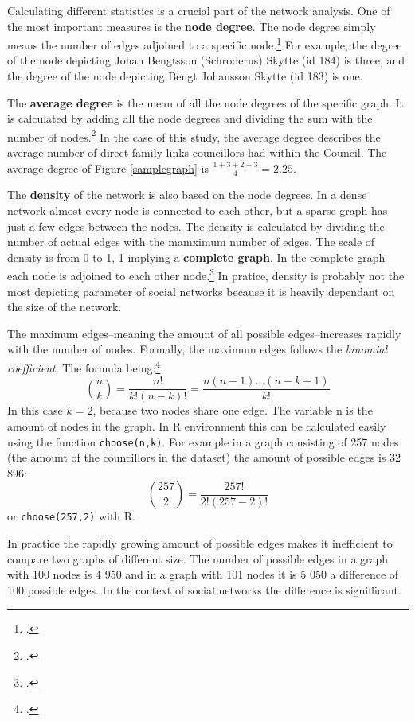 Calculating different statistics is a crucial part of the network analysis. One of the most important measures is the \textbf{node degree}. The node degree simply means the number of edges adjoined to a specific node.\footcite[pp. 2-3.]{RajPM2018} For example, the degree of the node depicting Johan Bengtsson (Schroderus) Skytte (id 184) is three, and the degree of the node depicting Bengt Johansson Skytte (id 183) is one. 

The \textbf{average degree} is the mean of all the node degrees of the specific graph. It is calculated by adding all the node degrees and dividing the sum with the number of nodes.\footcite[pp. 3-4.]{RajPM2018} In the case of this study, the average degree describes the average number of direct family links councillors had within the Council. The average degree of Figure \ref{samplegraph} is $\frac{1 + 3 + 2 + 3}{4} = 2.25$.

The \textbf{density} of the network is also based on the node degrees. In a dense network almost every node is connected to each other, but a sparse graph has just a few edges between the nodes. The density is calculated by dividing the number of actual edges with the mamximum number of edges. The scale of density is from 0 to 1, 1 implying a \textbf{complete graph}. In the complete graph each node is adjoined to each other node.\footcite[pp. 5-6.]{RajPM2018} In pratice, density is probably not the most depicting parameter of social networks because it is heavily dependant on the size of the network. 

The maximum edges–meaning the amount of all possible edges–increases rapidly with the number of nodes. Formally, the maximum edges follows the \textit{binomial coefficient}. The formula being:\footcites[p. 16.]{laininen2002}[pp. 5-6.]{RajPM2018}
\begin{equation*}
\binom{n}{k} = \frac{n!}{k!(n-k)!} = \frac{n(n-1)...(n-k+1)}{k!}
\end{equation*}
In this case $k = 2$, because two nodes share one edge. The variable n is the amount of nodes in the graph. In R environment this can be calculated easily using the function \texttt{choose(n,k)}. For example in a graph consisting of 257 nodes (the amount of the councillors in the dataset) the amount of possible edges is 32 896:
\begin{equation*}
\binom{257}{2} = \frac{257!}{2!(257-2)!}
\end{equation*}
or \texttt{choose(257,2)} with R.

In practice the rapidly growing amount of possible edges makes it inefficient to compare two graphs of different size. The number of possible edges in a graph with 100 nodes is 4 950 and in a graph with 101 nodes it is 5 050 a difference of 100 possible edges. In the context of social networks the difference is signifficant.

